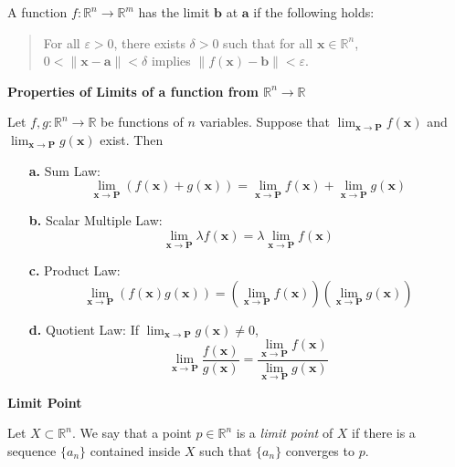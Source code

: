 \documentclass{article}
\newcommand{\R}{\mathbb{R}}
\begin{document}
A function \( f : \R^n \rightarrow \R^m \) has the limit \( \bm{b} \) at \( \bm{a} \) if the following holds:
\begin{quote}
    For all \(\varepsilon > 0\), there exists \(\delta > 0\) such that for all \( \bm{x} \in \R^n \),\\
    \(0 < \|\bm{x} - \bm{a}\| < \delta\) implies \(\|f(\bm{x}) - \bm{b}\| < \varepsilon\).
\end{quote}

\vspace{0.5cm}

\noindent \textbf{Properties of Limits of a function from \( \R^n \to \R \)}

Let \( f, g : \mathbb{R}^n \rightarrow \mathbb{R} \) be functions of \( n \) variables. Suppose that \(\lim_{\bm{x} \to \bm{P}} f(\bm{x})\) and \(\lim_{\bm{x} \to \bm{P}} g(\bm{x})\) exist. Then

\begin{enumerate}
    \item[{\bf a.}] Sum Law:
    \[\lim_{\bm{x} \to \bm{P}} (f(\bm{x}) + g(\bm{x})) = \lim_{\bm{x} \to \bm{P}} f(\bm{x}) + \lim_{\bm{x} \to \bm{P}} g(\bm{x})\]
    
    \item[{\bf b.}] Scalar Multiple Law:
    \[\lim_{\bm{x} \to \bm{P}} \lambda f(\bm{x}) = \lambda \lim_{\bm{x} \to \bm{P}} f(\bm{x})\]
    
    \item[{\bf c.}] Product Law:
    \[\lim_{\bm{x} \to \bm{P}} (f(\bm{x})g(\bm{x})) = \left( \lim_{\bm{x} \to \bm{P}} f(\bm{x}) \right)\left( \lim_{\bm{x} \to \bm{P}} g(\bm{x}) \right)\]
    
    \item[{\bf d.}] Quotient Law: If \(\lim_{\bm{x} \to \bm{P}} g(\bm{x}) \neq 0\),
    \[\lim_{\bm{x} \to \bm{P}} \frac{f(\bm{x})}{g(\bm{x})} = \frac{\lim_{\bm{x} \to \bm{P}} f(\bm{x})}{\lim_{\bm{x} \to \bm{P}} g(\bm{x})}\]
\end{enumerate}

\vspace{0.5cm}

\noindent \textbf{Limit Point}

Let \( X \subset \mathbb{R}^n \). We say that a point \( p \in \mathbb{R}^n \) is a \textit{limit point} of \( X \) if there is a sequence \( \{a_n\} \) contained inside \( X \) such that \( \{a_n\} \) converges to \( p \).

\vspace{0.5cm}
\end{document}
